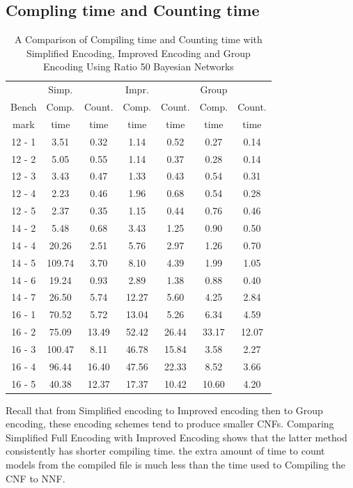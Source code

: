 \subsection{Compling time and Counting time}
\begin{table}[]
    \centering
    \begin{tabular}{ c | c c | c c | c c}
    \hline
    	    	&	Simp.	&		&	Impr. 	&	 &	Group	&		\\
   		Bench	&	Comp.	&	Count.	&	Comp. 	&	Count. &	Comp. 	&	Count.	\\
   		mark		&	time	&	time	&	time	&time	& time	&	time	\\
   	\hline
   	\hline
12	-	1	&	3.51	&	0.32	&	1.14	&	0.52	&	0.27	&	0.14	\\
12	-	2	&	5.05	&	0.55	&	1.14	&	0.37	&	0.28	&	0.14	\\
12	-	3	&	3.43	&	0.47	&	1.33	&	0.43	&	0.54	&	0.31	\\
12	-	4	&	2.23	&	0.46	&	1.96	&	0.68	&	0.54	&	0.28	\\
12	-	5	&	2.37	&	0.35	&	1.15	&	0.44	&	0.76	&	0.46	\\
14	-	2	&	5.48	&	0.68	&	3.43	&	1.25	&	0.90	&	0.50	\\
14	-	4	&	20.26	&	2.51	&	5.76	&	2.97	&	1.26	&	0.70	\\
14	-	5	&	109.74	&	3.70	&	8.10	&	4.39	&	1.99	&	1.05	\\
14	-	6	&	19.24	&	0.93	&	2.89	&	1.38	&	0.88	&	0.40	\\
14	-	7	&	26.50	&	5.74	&	12.27	&	5.60	&	4.25	&	2.84	\\
16	-	1	&	70.52	&	5.72	&	13.04	&	5.26	&	6.34	&	4.59	\\
16	-	2	&	75.09	&	13.49	&	52.42	&	26.44	&	33.17	&	12.07	\\
16	-	3	&	100.47	&	8.11	&	46.78	&	15.84	&	3.58	&	2.27	\\
16	-	4	&	96.44	&	16.40	&	47.56	&	22.33	&	8.52	&	3.66	\\
16	-	5	&	40.38	&	12.37	&	17.37	&	10.42	&	10.60	&	4.20	\\
	\hline
	\hline
    \end{tabular}
    \caption{A Comparison of Compiling time and Counting time with Simplified Encoding, Improved Encoding and Group Encoding Using Ratio 50 Bayesian Networks}
    \label{tab:comparing time}
\end{table}

\noindent Recall that from Simplified encoding to Improved encoding then to Group encoding, these encoding schemes tend to produce smaller CNFs. Comparing Simplified Full Encoding with Improved Encoding shows that the latter method consistently has shorter compiling time.  the extra amount of time to count models from the compiled file is much less than the time used to Compiling the CNF to NNF.\\

